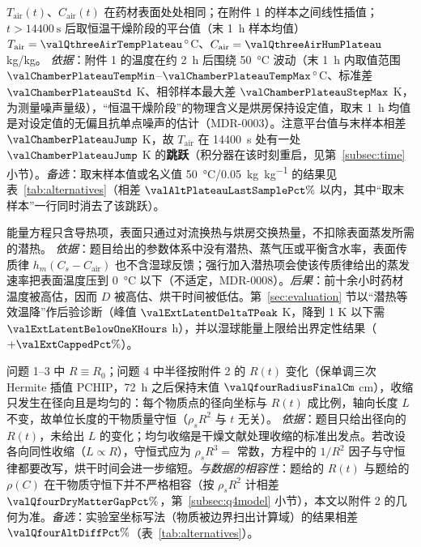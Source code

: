 \begin{assumption}\label{as:chamber}
$T_{\mathrm{air}}(t)$、$C_{\mathrm{air}}(t)$ 在药材表面处处相同；在附件 1 的样本之间线性插值；$t>\SI{14400}{\second}$ 后取恒温干燥阶段的平台值（末 \SI{1}{\hour} 样本均值）$T_{\mathrm{air}}=\valQthreeAirTempPlateau\,^\circ$C、$C_{\mathrm{air}}=\valQthreeAirHumPlateau$ kg/kg。
\emph{依据}：附件 1 的温度在约 \SI{2}{\hour} 后围绕 \SI{50}{\celsius} 波动（末 \SI{1}{\hour} 内取值范围 $\valChamberPlateauTempMin$--$\valChamberPlateauTempMax\,^\circ$C、标准差 $\valChamberPlateauStd$ \si{\kelvin}、相邻样本最大差 $\valChamberPlateauStepMax$ \si{\kelvin}，为测量噪声量级），“恒温干燥阶段”的物理含义是烘房保持设定值，取末 \SI{1}{\hour} 均值是对设定值的无偏且抗单点噪声的估计（MDR-0003）。注意平台值与末样本相差 $\valChamberPlateauJump$ \si{\kelvin}，故 $T_{\mathrm{air}}$ 在 \SI{14400}{\second} 处有一处 $\valChamberPlateauJump$ \si{\kelvin} 的\textbf{跳跃}（积分器在该时刻重启，见第~\ref{subsec:time} 小节）。\emph{备选}：取末样本值或名义值 \SI{50}{\celsius}/\SI{0.05}{\kilo\gram\per\kilo\gram} 的结果见表~\ref{tab:alternatives}（相差 $\valAltPlateauLastSamplePct\%$ 以内，其中“取末样本”一行同时消去了该跳跃）。
\end{assumption}

\begin{assumption}[能量方程不含蒸发潜热源，题给]\label{as:latent}
能量方程只含导热项，表面只通过对流换热与烘房交换热量，不扣除表面蒸发所需的潜热。
\emph{依据}：题目给出的参数体系中没有潜热、蒸气压或平衡含水率，表面传质律 $h_m(C_s-C_{\mathrm{air}})$ 也不含湿球反馈；强行加入潜热项会使该传质律给出的蒸发速率把表面温度压到 \SI{0}{\celsius} 以下（不适定，MDR-0008）。\emph{后果}：前十余小时药材温度被高估，因而 $D$ 被高估、烘干时间被低估。第~\ref{sec:evaluation} 节以“潜热等效温降”作后验诊断（峰值 $\valExtLatentDeltaTPeak$ K，降到 1 K 以下需 $\valExtLatentBelowOneKHours$ h），并以湿球能量上限给出界定性结果（$+\valExtCappedPct\%$）。
\end{assumption}

\begin{assumption}\label{as:shrink}
问题 1--3 中 $R\equiv R_0$；问题 4 中半径按附件 2 的 $R(t)$ 变化（保单调三次 Hermite 插值 PCHIP\cite{fritsch1980}，\SI{72}{\hour} 之后保持末值 $\valQfourRadiusFinalCm$ \si{\centi\meter}），收缩只发生在径向且是均匀的：每个物质点的径向坐标与 $R(t)$ 成比例，轴向长度 $L$ 不变，故单位长度的干物质量守恒（$\rho_sR^2$ 与 $t$ 无关）。
\emph{依据}：题目只给出径向的 $R(t)$，未给出 $L$ 的变化；均匀收缩是干燥文献处理收缩的标准出发点\cite{ratti1994}。若改设各向同性收缩（$L\propto R$），守恒式应为 $\rho_sR^3=$ 常数，方程中的 $1/R^2$ 因子与守恒律都要改写，烘干时间会进一步缩短。\emph{与数据的相容性}：题给的 $R(t)$ 与题给的 $\rho(C)$ 在干物质守恒下并不严格相容（按 $\rho_sR^2$ 计相差 $\valQfourDryMatterGapPct\%$，第~\ref{subsec:q4model} 小节），本文以附件 2 的几何为准。\emph{备选}：实验室坐标写法（物质被边界扫出计算域）的结果相差 $\valQfourAltDiffPct\%$（表~\ref{tab:alternatives}）。
\end{assumption}

